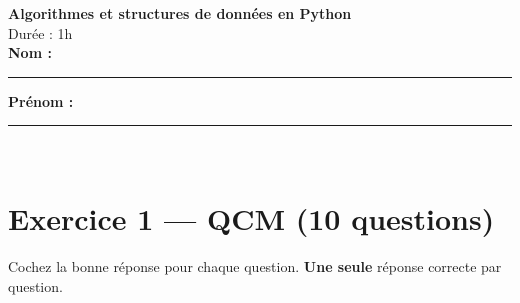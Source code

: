 \documentclass[11pt,a4paper]{exam}
\begin{document}
\begin{center}
  \Large\textbf{Algorithmes et structures de données en Python}\\[0.5em]
  \normalsize Durée : 1h \\
  \vspace{1em}
  \textbf{Nom :} \rule{6cm}{0.4pt} \hfill
  \textbf{Prénom :} \rule{6cm}{0.4pt}\\[1em]
\end{center}

\vspace{1em}

\section*{Exercice 1 — QCM (10 questions)}

Cochez la bonne réponse pour chaque question. \textbf{Une seule} réponse correcte par question.
\end{document}
